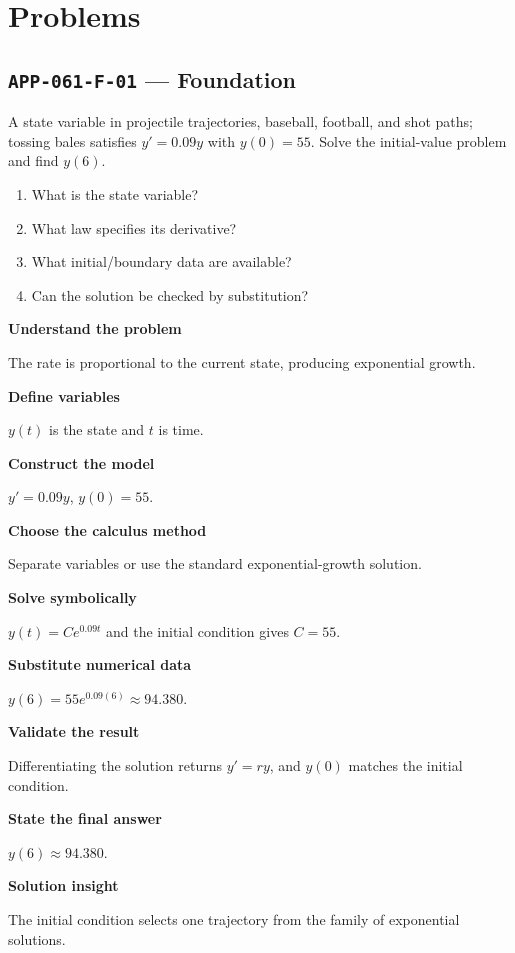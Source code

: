 \documentclass[11pt]{book}
\newcommand{\pid}[1]{\texttt{#1}}
\begin{document}
\section*{Problems}
\subsection*{\pid{APP-061-F-01} — Foundation}
\begin{problembox}
A state variable in projectile trajectories, baseball, football, and shot paths; tossing bales satisfies $y'=0.09y$ with $y(0)=55$. Solve the initial-value problem and find $y(6)$.
\end{problembox}
\begin{promptbox}\begin{enumerate}
\item What is the state variable?
\item What law specifies its derivative?
\item What initial/boundary data are available?
\item Can the solution be checked by substitution?
\end{enumerate}\end{promptbox}
\begin{solutionbox}
\textbf{Understand the problem}\par The rate is proportional to the current state, producing exponential growth.\par\medskip
\textbf{Define variables}\par $y(t)$ is the state and $t$ is time.\par\medskip
\textbf{Construct the model}\par $y'=0.09y$, $y(0)=55$.\par\medskip
\textbf{Choose the calculus method}\par Separate variables or use the standard exponential-growth solution.\par\medskip
\textbf{Solve symbolically}\par $y(t)=Ce^{0.09t}$ and the initial condition gives $C=55$.\par\medskip
\textbf{Substitute numerical data}\par $y(6)=55e^{0.09(6)}\approx 94.380$.\par\medskip
\textbf{Validate the result}\par Differentiating the solution returns $y'=ry$, and $y(0)$ matches the initial condition.\par\medskip
\textbf{State the final answer}\par $y(6)\approx 94.380$.\par\medskip
\textbf{Solution insight}\par The initial condition selects one trajectory from the family of exponential solutions.\par\medskip
\end{solutionbox}
\end{document}
